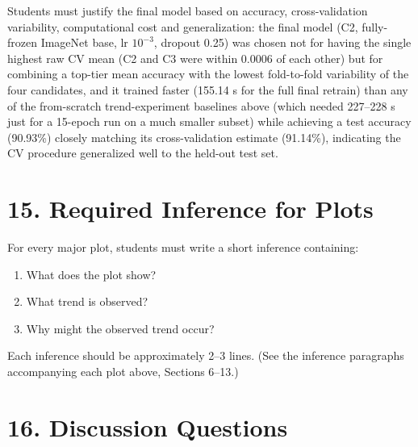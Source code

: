 \documentclass[10pt]{article}
\begin{document}
Students must justify the final model based on accuracy, cross-validation
variability, computational cost and generalization: the final model
(C2, fully-frozen ImageNet base, lr $10^{-3}$, dropout 0.25) was chosen
not for having the single highest raw CV mean (C2 and C3 were within
0.0006 of each other) but for combining a top-tier mean accuracy with the
lowest fold-to-fold variability of the four candidates, and it trained
faster (155.14 s for the full final retrain) than any of the from-scratch
trend-experiment baselines above (which needed 227--228 s just for a
15-epoch run on a much smaller subset) while achieving a test accuracy
(90.93\%) closely matching its cross-validation estimate (91.14\%),
indicating the CV procedure generalized well to the held-out test set.

\section*{15. Required Inference for Plots}

For every major plot, students must write a short inference containing:

\begin{enumerate}
\item What does the plot show?
\item What trend is observed?
\item Why might the observed trend occur?
\end{enumerate}

Each inference should be approximately 2--3 lines. (See the inference
paragraphs accompanying each plot above, Sections 6--13.)

\section*{16. Discussion Questions}
\end{document}
